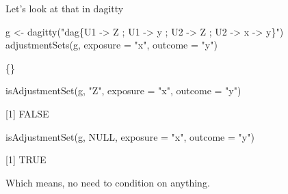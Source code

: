 \documentclass[
  11pt,
  ignorenonframetext,
]{beamer}
\newenvironment{Shaded}{\begin{snugshade}}{\end{snugshade}}
\newcommand{\AttributeTok}[1]{\textcolor[rgb]{0.40,0.45,0.13}{#1}}
\newcommand{\ConstantTok}[1]{\textcolor[rgb]{0.56,0.35,0.01}{#1}}
\newcommand{\FunctionTok}[1]{\textcolor[rgb]{0.28,0.35,0.67}{#1}}
\newcommand{\NormalTok}[1]{\textcolor[rgb]{0.00,0.23,0.31}{#1}}
\newcommand{\OtherTok}[1]{\textcolor[rgb]{0.00,0.23,0.31}{#1}}
\newcommand{\StringTok}[1]{\textcolor[rgb]{0.13,0.47,0.30}{#1}}
\begin{document}
\begin{frame}[fragile]{Let's look at that in dagitty}
\protect\hypertarget{lets-look-at-that-in-dagitty}{}
\begin{Shaded}
\begin{Highlighting}[]
\NormalTok{g }\OtherTok{\textless{}{-}} \FunctionTok{dagitty}\NormalTok{(}\StringTok{"dag\{U1 {-}\textgreater{} Z  ; U1 {-}\textgreater{} y ; U2 {-}\textgreater{} Z ; U2 {-}\textgreater{} x  {-}\textgreater{} y\}"}\NormalTok{)}
\FunctionTok{adjustmentSets}\NormalTok{(g, }\AttributeTok{exposure =} \StringTok{"x"}\NormalTok{, }\AttributeTok{outcome =} \StringTok{"y"}\NormalTok{)}
\end{Highlighting}
\end{Shaded}

\{\}

\begin{Shaded}
\begin{Highlighting}[]
\FunctionTok{isAdjustmentSet}\NormalTok{(g, }\StringTok{"Z"}\NormalTok{, }\AttributeTok{exposure =} \StringTok{"x"}\NormalTok{, }\AttributeTok{outcome =} \StringTok{"y"}\NormalTok{)}
\end{Highlighting}
\end{Shaded}

{[}1{]} FALSE

\begin{Shaded}
\begin{Highlighting}[]
\FunctionTok{isAdjustmentSet}\NormalTok{(g, }\ConstantTok{NULL}\NormalTok{, }\AttributeTok{exposure =} \StringTok{"x"}\NormalTok{, }\AttributeTok{outcome =} \StringTok{"y"}\NormalTok{)}
\end{Highlighting}
\end{Shaded}

{[}1{]} TRUE

Which means, no need to condition on anything.
\end{frame}
\end{document}
